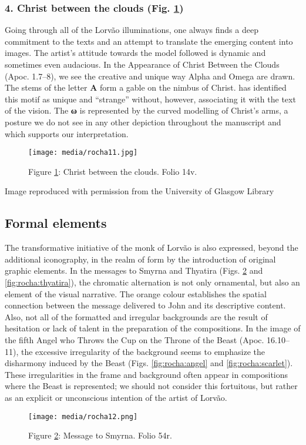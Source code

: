 \documentclass{article}
\begin{document}
\subsubsection{4. Christ between the clouds (Fig. \ref{fig:rocha:christ})} Going through all of
the Lorvão illuminations, one always finds a deep commitment to the
texts and an attempt to translate the emerging content into images. The
artist's attitude towards the model followed is dynamic and sometimes
even audacious. In the Appearance of Christ Between the Clouds (Apoc.
1.7--8), we see the creative and unique way Alpha and Omega are drawn.
The stems of the letter \textbf{Α} form a gable on the nimbus of Christ. \citet[56]{klein_beato_2004} has identified this motif as unique and ``strange''
without, however, associating it with the text of the vision. The
\textbf{ω} is represented by the curved modelling of Christ's arms, a
posture we do not see in any other depiction throughout the manuscript
and which supports our interpretation.

\begin{figure}[H]
    \centering
    \texttt{[image: media/rocha11.jpg]}
    \caption{Figure \ref{fig:rocha:christ}: Christ between the clouds. Folio 14v.}
    \label{fig:rocha:christ}
\end{figure}


 Image reproduced with permission from the University of Glasgow Library 


 
\subsection*{Formal elements}

The transformative initiative of the monk of Lorvão is also expressed,
beyond the additional iconography, in the realm of form by the
introduction of original graphic elements. In the messages to Smyrna and
Thyatira (Figs. \ref{fig:rocha:smyrna} and \ref{fig:rocha:thyatira}), the chromatic alternation is not only
ornamental, but also an element of the visual narrative. The orange
colour establishes the spatial connection between the message delivered
to John and its descriptive content. Also, not all of the formatted and
irregular backgrounds are the result of hesitation or lack of talent in
the preparation of the compositions. In the image of the fifth Angel who
Throws the Cup on the Throne of the Beast (Apoc. 16.10--11), the
excessive irregularity of the background seems to emphasize the
disharmony induced by the Beast (Figs. \ref{fig:rocha:angel} and \ref{fig:rocha:scarlet}). These irregularities
in the frame and background often appear in compositions where the Beast
is represented; we should not consider this fortuitous, but rather as an
explicit or unconscious intention of the artist of Lorvão.
\vfill
\begin{figure}[H]

    \centering
    \texttt{[image: media/rocha12.png]}
    \caption{Figure \ref{fig:rocha:smyrna}: Message to Smyrna. Folio 54r.}
    \label{fig:rocha:smyrna}
    \end{figure}
\end{document}
